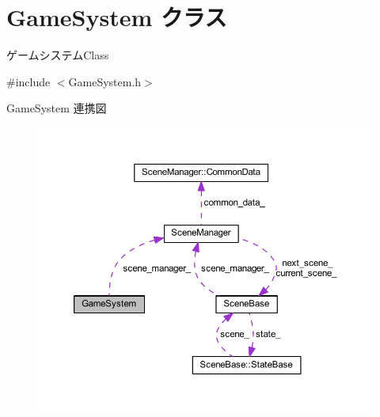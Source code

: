 \hypertarget{class_game_system}{}\section{Game\+System クラス}
\label{class_game_system}


ゲームシステム\+Class  




{\ttfamily \#include $<$Game\+System.\+h$>$}



Game\+System 連携図
\nopagebreak
\begin{figure}[H]
\begin{center}
\leavevmode
\includegraphics[width=350pt]{class_game_system__coll__graph}
\end{center}
\end{figure}
